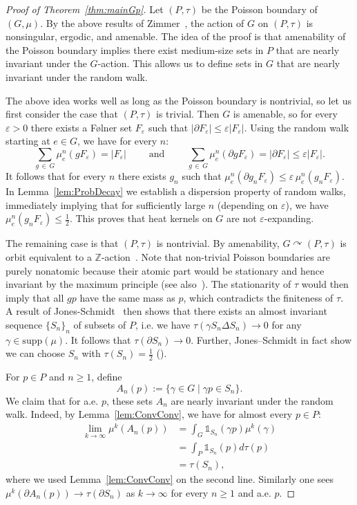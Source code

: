 \documentclass[10pt]{amsart}
\theoremstyle{definition}\newtheorem{defi}[theo]{Definition}\newtheorem{rema}[theo]{Remark}\newtheorem{exam}[theo]{Example}\newtheorem{exem}[theo]{Example}\newtheorem{nota}[theo]{Notation}
\newcommand{\bbZ}{\mathbb{Z}}
\newcommand{\bbone}{\mathds{1}}
\begin{document}
\begin{proof}[{Proof of Theorem~\ref{thm:mainGp}}]
Let $(P,\tau)$ be the Poisson boundary of $(G,\mu)$. By the above results of Zimmer~\cite{Zimmer78}, the action of $G$ on $(P,\tau)$ is nonsingular, ergodic, and amenable. The idea of the proof is that amenability of the Poisson boundary implies there exist medium-size sets in $P$ that are nearly invariant under the $G$-action. This allows us to define sets in $G$ that are nearly invariant under the random walk.

The above idea works well as long as the Poisson boundary is nontrivial, so let us first consider the case that $(P,\tau)$ is trivial. Then $G$ is amenable, so for every $\varepsilon>0$ there exists a F{\o}lner set $F_\varepsilon$ such that $|\partial F_\varepsilon|\leq \varepsilon|F_\varepsilon|$. Using the random walk starting at $e\in G$, we have for every $n$:
\[
\sum_{g\,\in\,G} \mu_e^n(gF_\varepsilon)= |F_\varepsilon| \qquad \text{ and } \qquad \sum_{g\,\in\,G} \mu_e^n(\partial gF_\varepsilon)=|\partial F_\varepsilon|\leq \varepsilon|F_\varepsilon|.
\]
It follows that for every $n$ there exists $g_n$ such that $\mu_e^n(\partial g_n F_\varepsilon)\leq \varepsilon \, \mu_e^n(g_n F_\varepsilon)$. In Lemma~\ref{lem:ProbDecay} we establish a dispersion property of random walks, immediately implying that for sufficiently large $n$ (depending on $\varepsilon$), we have $\mu_e^n(g_n F_\varepsilon)\leq \frac{1}{2}$. This proves that heat kernels on $G$ are not $\varepsilon$-expanding.

The remaining case is that $(P,\tau)$ is nontrivial. By amenability, $G\curvearrowright (P,\tau)$ is orbit equivalent to a $\bbZ$-action~\cite{ConnesFeldmanWeiss}. Note that non-trivial Poisson boundaries are purely nonatomic because their atomic part would be stationary and hence invariant by the maximum principle (see also~\cite[Corollary~3.3.1]{Kai05}). The stationarity of $\tau$ would then imply that all $gp$ have the same mass as $p$, which contradicts the finiteness of $\tau$. A result of Jones-Schmidt~\cite{JonesSchmidt} then shows that there exists an almost invariant sequence $\{S_n\}_n$ of subsets of $P$, i.e. we have $\tau(\gamma S_n \Delta S_n)\to 0$ for any $\gamma\in\text{supp}(\mu)$. It follows that $\tau(\partial S_n)\to 0$. Further, Jones--Schmidt in fact show we can choose $S_n$ with $\tau(S_n)=\frac{1}{2}$ (\cite[Lemma~2.3]{JonesSchmidt}).

For $p\in P$ and $n\geq 1$, define
\[
A_n(p):= \{\gamma\in G\mid \gamma p \in S_n\}.
\]
We claim that for a.e. $p$, these sets $A_n$ are nearly invariant under the random walk. Indeed, by Lemma~\ref{lem:ConvConv}, we have for almost every $p\in P$:
\begin{align*}
\lim_{k\to\infty} \mu^k(A_n(p))&=\int_G \bbone_{S_n}(\gamma p) \mu^k(\gamma)\\
&=\int_P \bbone_{S_n}(p) d\tau(p)\\
&=\tau(S_n),
\end{align*}
where we used Lemma~\ref{lem:ConvConv} on the second line. Similarly one sees $\mu^k(\partial A_n(p))\to \tau(\partial S_n)$ as $k\to\infty$ for every $n\geq 1$ and a.e. $p$.
\end{proof}
\end{document}
